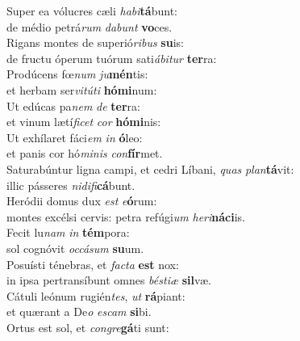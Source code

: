 \oddverse Super ea vólucres cæli \textit{ha}\textit{bi}\textbf{tá}bunt:~\*\\
\oddverse de médio petrá\textit{rum} \textit{da}\textit{bunt} \textbf{vo}ces.\\
\evenverse Rigans montes de superió\textit{ri}\textit{bus} \textbf{su}is:~\*\\
\evenverse de fructu óperum tuórum sati\textit{á}\textit{bi}\textit{tur} \textbf{ter}ra:\\
\oddverse Prodúcens fœ\textit{num} \textit{ju}\textbf{mén}tis:~\*\\
\oddverse et herbam ser\textit{vi}\textit{tú}\textit{ti} \textbf{hó}\textbf{mi}num:\\
\evenverse Ut edúcas pa\textit{nem} \textit{de} \textbf{ter}ra:~\*\\
\evenverse et vinum lætí\textit{fi}\textit{cet} \textit{cor} \textbf{hó}\textbf{mi}nis:\\
\oddverse Ut exhílaret fáci\textit{em} \textit{in} \textbf{ó}leo:~\*\\
\oddverse et panis cor hó\textit{mi}\textit{nis} \textit{con}\textbf{fír}met.\\
\evenverse Saturabúntur ligna campi, et cedri Líbani, \textit{quas} \textit{plan}\textbf{tá}vit:~\*\\
\evenverse illic pásseres \textit{ni}\textit{di}\textit{fi}\textbf{cá}bunt.\\
\oddverse Heródii domus dux \textit{est} \textit{e}\textbf{ó}rum:~\*\\
\oddverse montes excélsi cervis: petra refúgi\textit{um} \textit{he}\textit{ri}\textbf{ná}\textbf{ci}is.\\
\evenverse Fecit lu\textit{nam} \textit{in} \textbf{tém}pora:~\*\\
\evenverse sol cognóvit \textit{oc}\textit{cá}\textit{sum} \textbf{su}um.\\
\oddverse Posuísti ténebras, et \textit{fa}\textit{cta} \textbf{est} nox:~\*\\
\oddverse in ipsa pertransíbunt omnes \textit{bé}\textit{sti}\textit{æ} \textbf{sil}væ.\\
\evenverse Cátuli leónum rugién\textit{tes}, \textit{ut} \textbf{rá}piant:~\*\\
\evenverse et quærant a De\textit{o} \textit{e}\textit{scam} \textbf{si}bi.\\
\oddverse Ortus est sol, et \textit{con}\textit{gre}\textbf{gá}ti sunt:~\*\\
